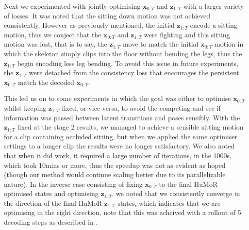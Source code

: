 Next we experimented with jointly optimising $\mathbf{x}_{0:T}$ and $\mathbf{z}_{1:T}$ with a larger variety of losses. It was noted that the sitting down motion was not achieved consistently. However as previously mentioned, the initial $\mathbf{z}_{1:T}$ encode a sitting motion, thus we conject that the $\mathbf{x}_{0:T}$ and $\mathbf{z}_{1:T}$ were fighting and this sitting motion was lost, that is to say, the $\mathbf{z}_{1:T}$ move to match the initial $\mathbf{x}_{0:T}$ motion in which the skeleton simply clips into the floor without bending the legs, thus the $\mathbf{z}_{1:T}$ begin encoding less leg bending. To avoid this issue in future experiments, the $\mathbf{z}_{1:T}$ were detached from the consistency loss that encourages the persistent $\mathbf{x}_{0:T}$ match the decoded $\mathbf{x}_{0:T}$.

This led us on to some experiments in which the goal was either to optimise $\mathbf{x}_{0:T}$ whilst keeping $\mathbf{z}_{1:T}$ fixed, or vice versa, to avoid the competing and see if information was passed between latent transitions and poses sensibly. With the $\mathbf{z}_{1:T}$ fixed at the stage 2 results, we managed to achieve a sensible sitting motion for a clip containing occluded sitting, but when we applied the same optimiser settings to a longer clip the results were no longer satisfactory. We also noted that when it did work, it required a large number of iterations, in the 1000s, which took 10mins or more, thus the speedup was not as evident as hoped (though our method would continue scaling better due to its parallelizable nature). In the inverse case consisting of fixing $\mathbf{x}_{0:T}$ to the final HuMoR optimised states and optimising $\mathbf{z}_{1:T}$, we noted that we consistently converge in the direction of the final HuMoR $\mathbf{z}_{1:T}$ states, which indicates that we are optimising in the right direction, note that this was acheived with a rollout of 5 decoding steps as described in .

